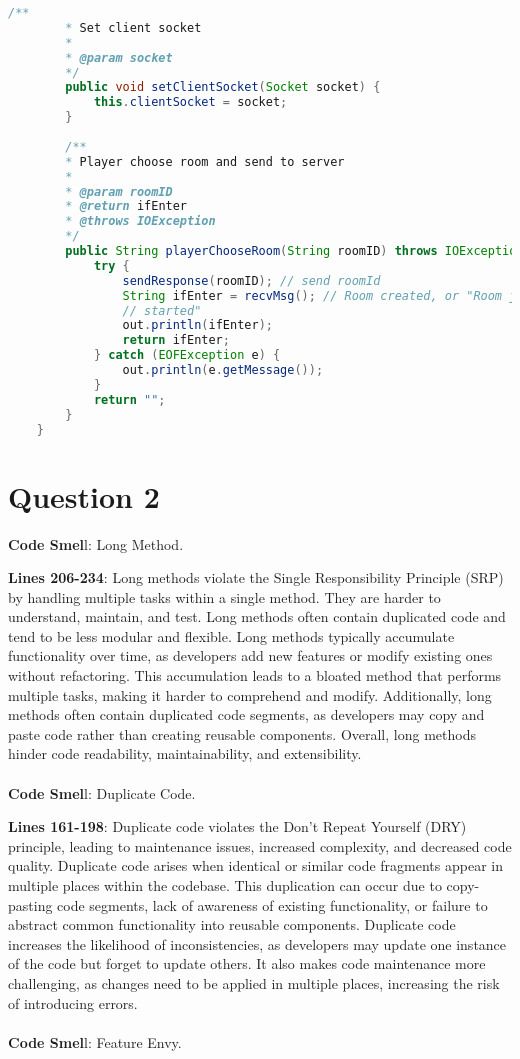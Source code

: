 \documentclass[12pt]{article}
\numberwithin{table}{section}
\begin{document}
\begin{lstlisting}[language=Java]
		/**
		* Set client socket
		* 
		* @param socket
		*/
		public void setClientSocket(Socket socket) {
			this.clientSocket = socket;
		}
		
		/**
		* Player choose room and send to server
		* 
		* @param roomID
		* @return ifEnter
		* @throws IOException
		*/
		public String playerChooseRoom(String roomID) throws IOException {
			try {
				sendResponse(roomID); // send roomId
				String ifEnter = recvMsg(); // Room created, or "Room joined." or "Room exceeded player number, game already
				// started"
				out.println(ifEnter);
				return ifEnter;
			} catch (EOFException e) {
				out.println(e.getMessage());
			}
			return "";
		}
	}\end{lstlisting} 

	\section*{Question 2} 
	\textbf{Code Smel}l: Long Method.
	
 	\textbf{Lines 206-234}: Long methods violate the Single Responsibility Principle (SRP) by handling multiple tasks within a single method. They are harder to understand, maintain, and test. Long methods often contain duplicated code and tend to be less modular and flexible. Long methods typically accumulate functionality over time, as developers add new features or modify existing ones without refactoring. This accumulation leads to a bloated method that performs multiple tasks, making it harder to comprehend and modify. Additionally, long methods often contain duplicated code segments, as developers may copy and paste code rather than creating reusable components. Overall, long methods hinder code readability, maintainability, and extensibility. \\
 	\\
 	\textbf{Code Smel}l: Duplicate Code.
 	
 	\textbf{Lines 161-198}: Duplicate code violates the Don't Repeat Yourself (DRY) principle, leading to maintenance issues, increased complexity, and decreased code quality. Duplicate code arises when identical or similar code fragments appear in multiple places within the codebase. This duplication can occur due to copy-pasting code segments, lack of awareness of existing functionality, or failure to abstract common functionality into reusable components. Duplicate code increases the likelihood of inconsistencies, as developers may update one instance of the code but forget to update others. It also makes code maintenance more challenging, as changes need to be applied in multiple places, increasing the risk of introducing errors. \\
 	\\
 	\textbf{Code Smel}l: Feature Envy.
 	
\end{document}

